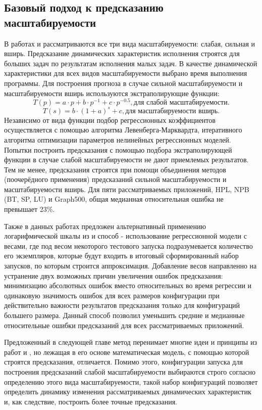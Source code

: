 	\subsection{Базовый подход к предсказанию масштабируемости}
		В работах \cite{Kazmina_Antonov_article} и \cite{Kazminf_Valkon_Antonov_article} рассматриваются все три вида масштабируемости: слабая, сильная и вширь. Предсказание динамических характеристик исполнения строятся для больших задач по результатам исполнения малых задач. В качестве динамической характеристики для всех видов масштабируемости выбрано время выполнения программы. Для построения прогноза в случае сильной масштабируемости и масштабируемости вширь используются экстраполирующие функции:
		\[
		T(p) = a \cdot p + b \cdot p^{-1} + c \cdot p^{-0.5}, \text{для слабой масштабируемости}.
		\]
		\[
		T(s) = b \cdot (1 + a)^{s} + c, \text{для масштабируемости вширь}.
		\]
		Независимо от вида функции подбор регрессионных коэффициентов осуществляется с помощью алгоритма Левенберга-Марквардта, итеративного алгоритма оптимизации параметров нелинейных регрессионных моделей. Попытки построить предсказания с помощью подбора экстраполирующей функции в случае слабой масштабируемости не дают приемлемых результатов. Тем не менее, предсказания строятся при помощи объединения методов (поочерёдного применения) предсказаний сильной масштабируемости и масштабируемости вширь. Для пяти рассматриваемых приложений, HPL, NPB (BT, SP, LU) и Graph500, общая медианная относительная ошибка не превышает 23\%. 

		Также в данных работах предложен альтернативный применению логарифмической шкалы из \cite{log_main} и \cite{focused_regression} способ - использование регрессионной модели с весами, где под весом некоторого тестового запуска подразумевается количество его экземпляров, которые будут входить в итоговый сформированный набор запусков, по которым строится аппроксимация. Добавление весов направленно на устранение двух возможных причин увеличения ошибок предсказания: минимизацию абсолютных ошибок вместо относительных во время регрессии и одинаковую значимость ошибок для всех размеров конфигурации при действительно важности результатов предсказания только для конфигураций большего размера. Данный способ позволил уменьшить средние и медианные относительные ошибки предсказаний для всех рассматриваемых приложений.

		Предложенный в следующей главе метод перенимает многие идеи и принципы из работ \cite{Kazmina_Antonov_article} и \cite{Kazminf_Valkon_Antonov_article}, но лежащая в его основе математическая модель, с помощью которой строятся предсказания, отличается. Помимо этого, конфигурации запуска для построения предсказаний слабой масштабируемости выбираются строго согласно определению этого вида масштабируемости, такой набор конфигураций позволяет определить динамику изменения рассматриваемых динамических характеристик и, как следствие, построить более точные предсказания.
\clearpage